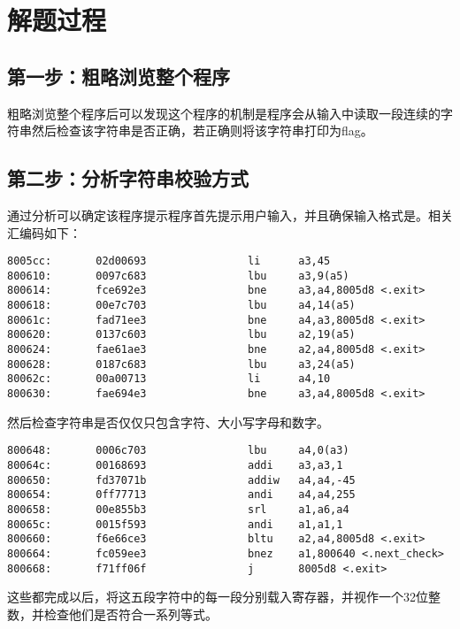 \documentclass[a4paper,UTF8]{ctexart}
\begin{document}
\section{解题过程}

\subsection{第一步：粗略浏览整个程序}

粗略浏览整个程序后可以发现这个程序的机制是程序会从输入中读取一段连续的字符串然后检查该字符串是否正确，若正确则将该字符串打印为flag。

\subsection{第二步：分析字符串校验方式}

通过分析可以确定该程序提示程序首先提示用户输入，并且确保输入格式是。相关汇编码如下：

\begin{verbatim}
8005cc:       02d00693                li      a3,45
800610:       0097c683                lbu     a3,9(a5)
800614:       fce692e3                bne     a3,a4,8005d8 <.exit>
800618:       00e7c703                lbu     a4,14(a5)
80061c:       fad71ee3                bne     a4,a3,8005d8 <.exit>
800620:       0137c603                lbu     a2,19(a5)
800624:       fae61ae3                bne     a2,a4,8005d8 <.exit>
800628:       0187c683                lbu     a3,24(a5)
80062c:       00a00713                li      a4,10
800630:       fae694e3                bne     a3,a4,8005d8 <.exit>
\end{verbatim}

然后检查字符串是否仅仅只包含字符、大小写字母和数字。

\begin{verbatim}
800648:       0006c703                lbu     a4,0(a3)
80064c:       00168693                addi    a3,a3,1
800650:       fd37071b                addiw   a4,a4,-45
800654:       0ff77713                andi    a4,a4,255
800658:       00e855b3                srl     a1,a6,a4
80065c:       0015f593                andi    a1,a1,1
800660:       f6e66ce3                bltu    a2,a4,8005d8 <.exit>
800664:       fc059ee3                bnez    a1,800640 <.next_check>
800668:       f71ff06f                j       8005d8 <.exit>
\end{verbatim}

这些都完成以后，将这五段字符中的每一段分别载入寄存器，并视作一个32位整数，并检查他们是否符合一系列等式。
\end{document}
